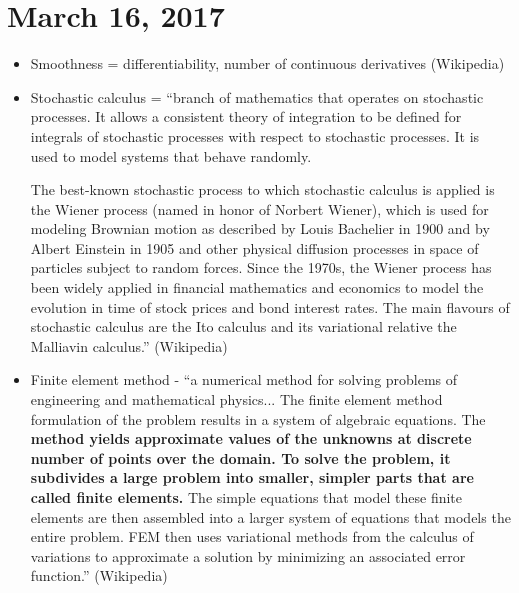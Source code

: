 \documentclass{article}
\begin{document}
\section*{March 16, 2017}
\begin{itemize}
\item Smoothness = differentiability, number of continuous derivatives (Wikipedia)
\item Stochastic calculus = ``branch of mathematics that operates on stochastic processes. It allows a consistent theory of integration to be defined for integrals of stochastic processes with respect to stochastic processes. It is used to model systems that behave randomly.

The best-known stochastic process to which stochastic calculus is applied is the Wiener process (named in honor of Norbert Wiener), which is used for modeling Brownian motion as described by Louis Bachelier in 1900 and by Albert Einstein in 1905 and other physical diffusion processes in space of particles subject to random forces. Since the 1970s, the Wiener process has been widely applied in financial mathematics and economics to model the evolution in time of stock prices and bond interest rates.
The main flavours of stochastic calculus are the Ito calculus and its variational relative the Malliavin calculus.'' (Wikipedia)

\item Finite element method - ``a numerical method for solving problems of engineering and mathematical physics... The finite element method formulation of the problem results in a system of algebraic equations. The {\bf method yields approximate values of the unknowns at discrete number of points over the domain. To solve the problem, it subdivides a large problem into smaller, simpler parts that are called finite elements.} The simple equations that model these finite elements are then assembled into a larger system of equations that models the entire problem. FEM then uses variational methods from the calculus of variations to approximate a solution by minimizing an associated error function.'' (Wikipedia)
\end{itemize}
\end{document}
